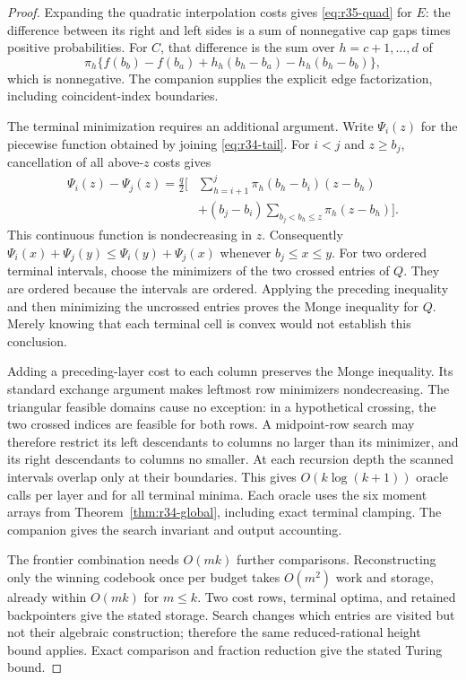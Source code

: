 \begin{proof}
Expanding the quadratic interpolation costs gives \eqref{eq:r35-quad} for $E$: the difference between its right and left sides is a sum of nonnegative cap gaps times positive probabilities. For $C$, that difference is the sum over $h=c+1,\ldots,d$ of
\[
 \pi_h\{f(b_b)-f(b_a)+h_h(b_h-b_a)-h_h(b_h-b_b)\},
\]
which is nonnegative. The companion supplies the explicit edge factorization, including coincident-index boundaries.

The terminal minimization requires an additional argument. Write $\Psi_i(z)$ for the piecewise function obtained by joining \eqref{eq:r34-tail}. For $i<j$ and $z\geq b_j$, cancellation of all above-$z$ costs gives
\begin{align}\label{eq:r35-difference}
 \Psi_i(z)-\Psi_j(z)=\frac q2\biggl[&
 \sum_{h=i+1}^{j}\pi_h(b_h-b_i)(z-b_h)\nonumber\\[-2pt]
 &+(b_j-b_i)\sum_{b_j<b_h\leq z}\pi_h(z-b_h)\biggr].
\end{align}
This continuous function is nondecreasing in $z$. Consequently $\Psi_i(x)+\Psi_j(y)\leq\Psi_i(y)+\Psi_j(x)$ whenever $b_j\leq x\leq y$. For two ordered terminal intervals, choose the minimizers of the two crossed entries of $Q$. They are ordered because the intervals are ordered. Applying the preceding inequality and then minimizing the uncrossed entries proves the Monge inequality for $Q$. Merely knowing that each terminal cell is convex would not establish this conclusion.

Adding a preceding-layer cost to each column preserves the Monge inequality. Its standard exchange argument makes leftmost row minimizers nondecreasing. The triangular feasible domains cause no exception: in a hypothetical crossing, the two crossed indices are feasible for both rows. A midpoint-row search may therefore restrict its left descendants to columns no larger than its minimizer, and its right descendants to columns no smaller. At each recursion depth the scanned intervals overlap only at their boundaries. This gives $O(k\log(k+1))$ oracle calls per layer and for all terminal minima. Each oracle uses the six moment arrays from Theorem~\ref{thm:r34-global}, including exact terminal clamping. The companion gives the search invariant and output accounting.

The frontier combination needs $O(mk)$ further comparisons. Reconstructing only the winning codebook once per budget takes $O(m^2)$ work and storage, already within $O(mk)$ for $m\leq k$. Two cost rows, terminal optima, and retained backpointers give the stated storage. Search changes which entries are visited but not their algebraic construction; therefore the same reduced-rational height bound applies. Exact comparison and fraction reduction give the stated Turing bound.\end{proof}

